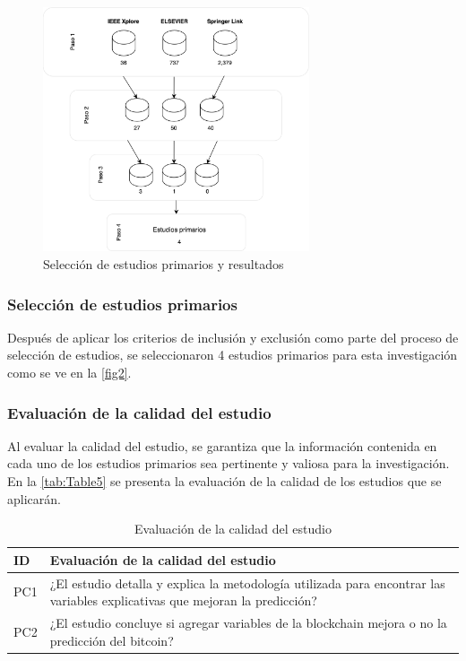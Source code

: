\begin{figure}[H]
	\centering
	\includegraphics[width=0.7\textwidth]{Chapter2/SelecEstudiPrim_2.png}
	\caption{Selección de estudios primarios y resultados}
	\label{fig2}
\end{figure}
\vspace{-0.8cm}
\subsubsection{Selección de estudios primarios}
Después de aplicar los criterios de inclusión y exclusión como parte del proceso de selección de estudios, se seleccionaron 4 estudios primarios para esta investigación como se ve en la \autoref{fig2}.\\
\vspace{-1cm}
\subsubsection{Evaluación de la calidad del estudio}
Al evaluar la calidad del estudio, se garantiza que la información contenida en cada uno de los estudios primarios sea pertinente y valiosa para la investigación. En la \autoref{tab:Table5} se presenta la evaluación de la calidad de los estudios que se aplicarán.

\begin{table}[H]
	\centering
	\begin{tabular}{ | m{2cm}| m{12cm} | }
		\hline
		\textbf{ID} & \textbf{Evaluación de la calidad del estudio}\\
		\hline
		PC1 & ¿El estudio detalla y explica la metodología utilizada para encontrar las variables explicativas que mejoran la predicción?\\
		\hline
		PC2 & ¿El estudio concluye si agregar variables de la blockchain mejora o no la predicción del bitcoin?\\
		\hline
	\end{tabular}
	\caption{Evaluación de la calidad del estudio}
	\label{tab:Table5}
\end{table}


